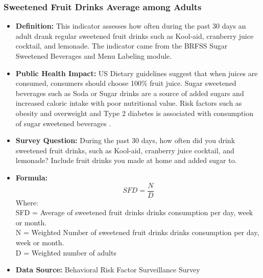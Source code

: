 \documentclass[12pt,letterpaper]{report}
\begin{document}
		\subsubsection{Sweetened Fruit Drinks Average among Adults} 
	\begin{itemize}
		\item \textbf{Definition:} This indicator assesses how often during the past 30 days an adult drank regular sweetened fruit drinks such as Kool-aid, cranberry juice cocktail, and lemonade. The indicator came from the BRFSS Sugar Sweetened Beverages and Menu Labeling module.  		
		\item \textbf{Public Health Impact:} US Dietary guidelines suggest that when juices are consumed, consumers should choose 100\% fruit juice\cite{DietaryGuidelines2010}. Sugar sweetened beverages such as Soda or Sugar drinks are a source of added sugars and increased caloric intake with poor nutritional value. Risk factors such as obesity and overweight and Type 2 diabetes is associated with consumption of sugar sweetened beverages \cite{vartanian2007effects}. 
		
		\item \textbf{Survey Question:} During the past 30 days, how often did you drink sweetened fruit drinks, such as Kool-aid, cranberry juice cocktail, and lemonade? Include fruit drinks you made at home and added sugar to.
		\item \textbf{Formula:} 
			\begin{equation}
			SFD = \frac{N}{D}
			\end{equation}
Where: \\
			SFD = Average of sweetened fruit drinks drinks consumption per day, week or month.\\
			
			N = Weighted Number of sweetened fruit drinks drinks consumption per day, week or month.\\
			
			D = Weighted number of adults\\
			
		\item \textbf{Data Source:} Behavioral Risk Factor Surveillance Survey
	\end{itemize}
	
\end{document}

